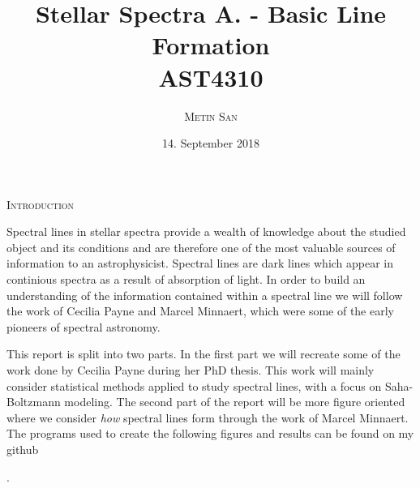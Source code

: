 \documentclass[a4paper,11.5pt,]{article}
\title{Stellar Spectra A. - Basic Line Formation\\
 AST4310}
\date{\normalsize{14. September 2018} }
\author{\textsc{\small{Metin San}}}
\begin{document}
\maketitle
\begin{center}
\textsc{Introduction}
\end{center}


\begin{adjustwidth}{1cm}{1cm}

Spectral lines in stellar spectra provide a wealth of knowledge about the studied object and its conditions and are therefore one of the most valuable sources of information to an astrophysicist. Spectral lines are dark lines which appear in continious spectra as a result of absorption of light. In order to build an understanding of the information contained within a spectral line we will follow the work of Cecilia Payne and Marcel Minnaert, which were some of the early pioneers of spectral astronomy. 

This report is split into two parts. In the first part we will recreate some of the work done by Cecilia Payne during her PhD thesis. This work will mainly consider statistical methods applied to study spectral lines, with a focus on Saha-Boltzmann modeling. The second part of the report will be more figure oriented where we consider \textit{how} spectral lines form through the work of Marcel Minnaert. The programs used to create the following figures and results can be found on my github

.
\end{adjustwidth}
\end{document}
